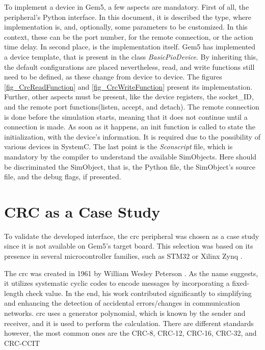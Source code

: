To implement a device in Gem5, a few aspects are mandatory. First of all, the peripheral's Python interface. In this document, it is 
described the type, where implementation is, and, optionally, some parameters to be customized. In this context, these can be
the port number, for the remote connection, or the action time delay. In second place, is the implementation itself. Gem5 has implemented 
a device template, that is present in the class \textit{BasicPioDevice}. By inheriting this, the default configurations are placed 
nevertheless, read, and write functions still need to be defined, as these change from device to device. The figures \ref{fig_CrcReadFunction} and \ref{fig_CrcWriteFunction}
present its implementation. Further, other aspects must be present, like the device registers, the socket\_ID, and the remote 
port functions(listen, accept, and detach). The remote connection is done before the simulation starts, meaning that it does not
continue until a connection is made. As soon as it happens, an init function is called to state the initialization, with the 
device's information. It is required due to the possibility of various devices in SystemC. The last point is the \textit{Sconscript} file, 
which is mandatory by the compiler to understand the available SimObjects. Here should be discriminated the SimObject, that is, 
the Python file, the SimObject's source file, and the debug flags, if presented.

\section{CRC as a Case Study}

To validate the developed interface, the \gls{crc} peripheral was chosen as a case study since it is not available on Gem5's target board.
This selection was based on its presence in several microcontroller families, such as STM32 \cite{referenceManualRM0385} or Xilinx Zynq \cite{xilinx2014zynq}.

The \gls{crc} was created in 1961 by William Wesley Peterson \cite{peterson1961cyclic}. As the name suggests, 
it utilizes systematic cyclic codes to encode messages by incorporating a fixed-length check value. In the end, his work
contributed significantly to simplifying and enhancing the detection of accidental errors/changes in communication 
networks. \gls{crc} uses a generator polynomial, which is known by the sender and receiver, and it is used to 
perform the calculation. There are different standards however, the most common ones are the CRC-8, CRC-12, CRC-16, 
CRC-32, and CRC-CCIT \cite{borrelli2001ieee}

